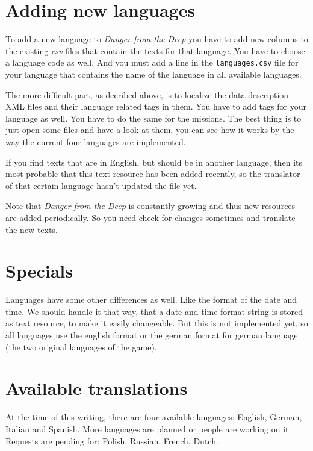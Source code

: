 \documentclass[a4paper,12pt]{report}
\begin{document}
\section{Adding new languages}

To add a new language to \emph{Danger from the Deep} you have to add new
columns to the existing \emph{csv} files that contain the texts for that
language. You have to choose a language code as well. And you must add a
line in the \texttt{languages.csv} file for your language that contains
the name of the language in all available languages.

The more difficult part, as decribed above, is to localize the data
description XML files and their language related tags in them. You have
to add tags for your language as well. You have to do the same for the
missions. The best thing is to just open some files and have a look at
them, you can see how it works by the way the current four languages are
implemented.

If you find texts that are in English, but should be in another
language, then its most probable that this text resource has been added
recently, so the translator of that certain language hasn't updated the
file yet.

Note that \emph{Danger from the Deep} is constantly growing and thus new
resources are added periodically. So you need check for changes
sometimes and translate the new texts.

\section{Specials}

Languages have some other differences as well. Like the format of the
date and time. We should handle it that way, that a date and time format
string is stored as text resource, to make it easily changeable. But
this is not implemented yet, so all languages use the english format or
the german format for german language (the two original languages of the
game).

\section{Available translations}

At the time of this writing, there are four available languages:
English, German, Italian and Spanish. More languages are planned or
people are working on it. Requests are pending for: Polish, Russian,
French, Dutch.
\end{document}
